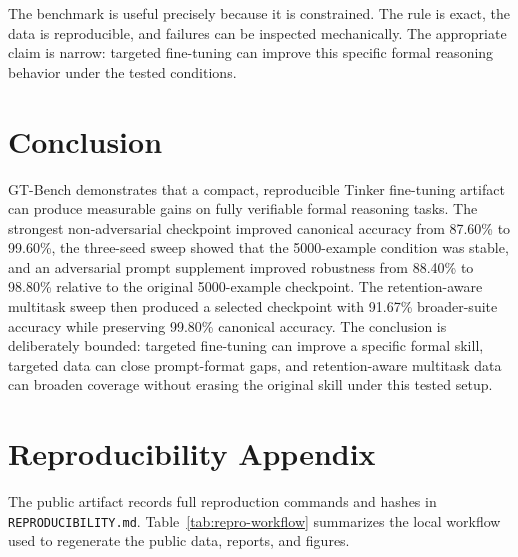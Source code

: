 \documentclass[11pt]{article}
\begin{document}
The benchmark is useful precisely because it is constrained. The rule is exact, the data is reproducible, and failures can be inspected mechanically. The appropriate claim is narrow: targeted fine-tuning can improve this specific formal reasoning behavior under the tested conditions.

\section{Conclusion}

GT-Bench demonstrates that a compact, reproducible Tinker fine-tuning artifact can produce measurable gains on fully verifiable formal reasoning tasks. The strongest non-adversarial checkpoint improved canonical accuracy from 87.60\% to 99.60\%, the three-seed sweep showed that the 5000-example condition was stable, and an adversarial prompt supplement improved robustness from 88.40\% to 98.80\% relative to the original 5000-example checkpoint. The retention-aware multitask sweep then produced a selected checkpoint with 91.67\% broader-suite accuracy while preserving 99.80\% canonical accuracy. The conclusion is deliberately bounded: targeted fine-tuning can improve a specific formal skill, targeted data can close prompt-format gaps, and retention-aware multitask data can broaden coverage without erasing the original skill under this tested setup.

\appendix

\section{Reproducibility Appendix}

The public artifact records full reproduction commands and hashes in \texttt{REPRODUCIBILITY.md}. Table~\ref{tab:repro-workflow} summarizes the local workflow used to regenerate the public data, reports, and figures.
\end{document}
